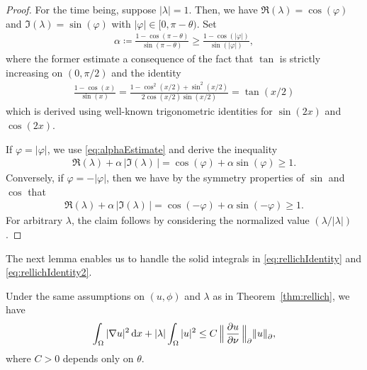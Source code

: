 \begin{proof}
  For the time being, suppose $|\lambda| = 1$.
  Then, we have $\Re(\lambda) = \cos(\varphi)$ and $\Im(\lambda) = \sin(\varphi)$ with $|\varphi| \in [0, \pi - \theta)$. 
  Set
  \begin{align}
    \label{eq:alphaEstimate}
    \alpha \coloneqq \frac{1 - \cos(\pi - \theta)}{\sin(\pi - \theta)} \geq \frac{1 - \cos(|\varphi|)}{\sin(|\varphi|)},
  \end{align}
  where the former estimate a consequence of the fact that $\tan$ is strictly increasing on $(0, \pi/2)$ and the identity 
  \begin{align*}
    \frac{1 - \cos(x)}{\sin(x)} = \frac{1 - \cos^2(x/2) + \sin^2(x/2)}{2 \cos(x/2) \sin(x/2)} =  \tan(x/2)
  \end{align*}
  which is derived using well-known trigonometric identities for $\sin(2x)$ and $\cos(2x)$.

  If $\varphi = |\varphi|$, we use \eqref{eq:alphaEstimate} and derive the inequality
  \begin{align*}
    \Re(\lambda) + \alpha \, |\Im(\lambda)\,| = \cos(\varphi) + \alpha \sin(\varphi) \geq 1.
  \end{align*}
  Conversely, if $\varphi = -|\varphi|$, then we have by the symmetry properties of $\sin$ and $\cos$ that
  \begin{align*}
    \Re(\lambda) + \alpha\, |\Im(\lambda)\,| = \cos(-\varphi) + \alpha \sin(-\varphi) \geq 1.
  \end{align*}
  For arbitrary $\lambda$, the claim follows by considering the normalized value $(\lambda / |\lambda|)$.
\end{proof}

The next lemma enables us to handle the solid integrals in \eqref{eq:rellichIdentity} and \eqref{eq:rellichIdentity2}.

\begin{lem}
  \label{lem:laxMilgramIneq}
  Under the same assumptions on $(u,\phi)$ and $\lambda$ as in Theorem~\ref{thm:rellich}, we have
  \begin{align}
    \label{eq:laxMilgramIneq}
    \int_\Omega |\nabla u|^2 \, {\operatorname{d}\!{x}} + |\lambda| \int_\Omega |u|^2 \leq C \,\Big\|\, \frac{\partial u}{\partial \nu} \, \Big\|^{}_\partial  \|u\|^{}_\partial,
  \end{align}
  where $C > 0$ depends only on $\theta$.
\end{lem}

